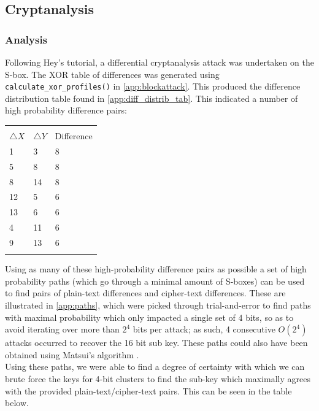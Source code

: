 \documentclass[british,11pt,a4paper]{article}
\begin{document}
\subsection{Cryptanalysis}
\subsubsection{Analysis}
Following Hey's tutorial, a differential cryptanalysis attack was undertaken on
the S-box. The XOR table of differences was generated using \lstinline{calculate_xor_profiles()} in \autoref{app:blockattack}. This produced the difference distribution table found in \autoref{app:diff_distrib_tab}.
This indicated a number of high probability difference pairs:

\begin{center}
	\begin{tabular}{lll}\label{tab:diffpairs} \\
		\toprule \\
		$\triangle X$ & $\triangle Y$ & Difference \\
		1 & 3 & 8 \\
    	5 & 8 & 8 \\
    	8 & 14 & 8 \\
    	12 & 5 & 6 \\
    	13 & 6 & 6 \\
    	4 & 11 & 6 \\
    	9 & 13 & 6 \\
		\bottomrule \\
	\end{tabular}
\end{center}

Using as many of these high-probability difference pairs as possible a set of high probability paths (which go through a minimal amount of S-boxes) can be used to find pairs of plain-text differences and cipher-text differences. These are illustrated in \autoref{app:paths}, which were picked through trial-and-error to find paths with maximal probability which only impacted a single set of 4 bits, so as to avoid iterating over more than \(2^4\) bits per attack; as such, 4 consecutive \(O(2^4)\) attacks occurred to recover the 16 bit sub key. These paths could also have been obtained using Matsui's algorithm \cite{matsui}. 
\\ 
Using these paths, we were able to find a degree of certainty with which we can brute force the keys for 4-bit clusters to find the sub-key which maximally agrees with the provided plain-text/cipher-text pairs. This can be seen in the table below.
\end{document}
